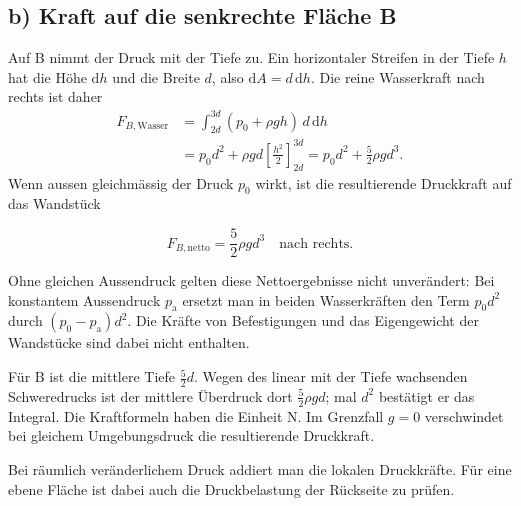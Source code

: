 \subsection*{b) Kraft auf die senkrechte Fläche B}
Auf B nimmt der Druck mit der Tiefe zu. Ein horizontaler Streifen in der Tiefe
\(h\) hat die Höhe \(\mathrm dh\) und die Breite \(d\), also
\(\mathrm dA=d\,\mathrm dh\). Die reine Wasserkraft nach rechts ist daher
\begin{align}
  F_{B,\mathrm{Wasser}}
  &=\int_{2d}^{3d}(p_0+\rho gh)\,d\,\mathrm dh\\
  &=p_0d^2+\rho gd\left[\frac{h^2}{2}\right]_{2d}^{3d}
    =p_0d^2+\frac52\rho gd^3.
\end{align}
Wenn aussen gleichmässig der Druck \(p_0\) wirkt, ist die resultierende
Druckkraft auf das Wandstück
\begin{ergebnis}
\begin{equation*}
  F_{B,\mathrm{netto}}=\frac52\rho gd^3\quad\text{nach rechts}.
\end{equation*}
\end{ergebnis}
Ohne gleichen Aussendruck gelten diese Nettoergebnisse nicht unverändert:
Bei konstantem Aussendruck \(p_{\mathrm{a}}\) ersetzt man in beiden
Wasserkräften den Term \(p_0d^2\) durch \((p_0-p_{\mathrm{a}})d^2\).
Die Kräfte von Befestigungen und das Eigengewicht der Wandstücke sind dabei
nicht enthalten.

\begin{kontrolle}[Plausibilität]
Für B ist die mittlere Tiefe \(\tfrac52d\). Wegen des linear mit der Tiefe
wachsenden Schweredrucks ist der mittlere Überdruck dort
\(\tfrac52\rho gd\); mal \(d^2\) bestätigt er das Integral. Die
Kraftformeln haben die Einheit \(\si{\newton}\). Im Grenzfall \(g=0\)
verschwindet bei gleichem Umgebungsdruck die resultierende Druckkraft.
\end{kontrolle}

\begin{merksatz}
Bei räumlich veränderlichem Druck addiert man die lokalen Druckkräfte. Für
eine ebene Fläche ist dabei auch die Druckbelastung der Rückseite zu prüfen.
\end{merksatz}
